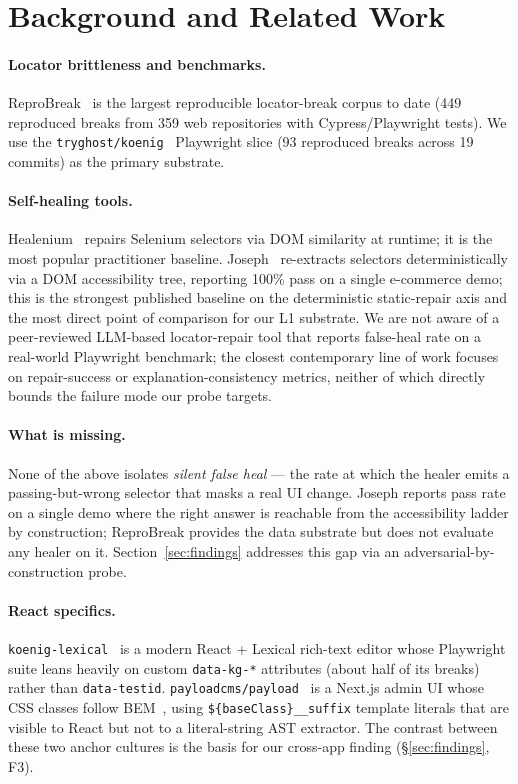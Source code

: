 \section{Background and Related Work}
\label{sec:background}

\paragraph{Locator brittleness and benchmarks.}
ReproBreak~\cite{mouraReproBreak2026} is the largest reproducible locator-break corpus to date (449 reproduced breaks from 359 web repositories with Cypress/Playwright tests). We use the \texttt{tryghost/koenig}~\cite{koenig} Playwright slice (93 reproduced breaks across 19 commits) as the primary substrate.

\paragraph{Self-healing tools.}
Healenium~\cite{healenium} repairs Selenium selectors via DOM similarity at runtime; it is the most popular practitioner baseline. Joseph~\cite{joseph2026zerocost} re-extracts selectors deterministically via a DOM accessibility tree, reporting 100\% pass on a single e-commerce demo; this is the strongest published baseline on the deterministic static-repair axis and the most direct point of comparison for our L1 substrate. We are not aware of a peer-reviewed LLM-based locator-repair tool that reports false-heal rate on a real-world Playwright benchmark; the closest contemporary line of work focuses on repair-success or explanation-consistency metrics, neither of which directly bounds the failure mode our probe targets.

\paragraph{What is missing.}
None of the above isolates \emph{silent false heal} --- the rate at which the healer emits a passing-but-wrong selector that masks a real UI change. Joseph reports pass rate on a single demo where the right answer is reachable from the accessibility ladder by construction; ReproBreak provides the data substrate but does not evaluate any healer on it. Section~\ref{sec:findings} addresses this gap via an adversarial-by-construction probe.

\paragraph{React specifics.}
\texttt{koenig-lexical}~\cite{lexicalRichText, koenig} is a modern React + Lexical rich-text editor whose Playwright suite leans heavily on custom \texttt{data-kg-*} attributes (about half of its breaks) rather than \texttt{data-testid}. \texttt{payloadcms/payload}~\cite{payloadCMS} is a Next.js admin UI whose CSS classes follow BEM~\cite{bemMethodology}, using \texttt{\$\{baseClass\}\_\_suffix} template literals that are visible to React but not to a literal-string AST extractor. The contrast between these two anchor cultures is the basis for our cross-app finding (\S\ref{sec:findings}, F3).
